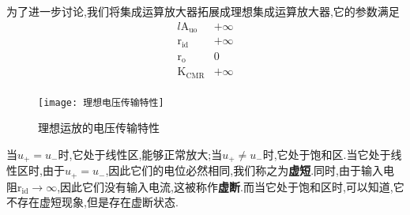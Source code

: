 \Par 为了进一步讨论,我们将集成运算放大器拓展成理想集成运算放大器,它的参数满足
\begin{equation*}
    \begin{matrix}{l}
        \mathrm{A}_{\mathrm{uo}}&		+\infty\\
        \mathrm{r}_{\mathrm{id}}&		+\infty\\
        \mathrm{r}_{\mathrm{o}}&		0\\
        \mathrm{K}_{\mathrm{CMR}}&		+\infty\\
    \end{matrix}
\end{equation*}
\begin{figure}[htbp]
	\centering
	\texttt{[image: 理想电压传输特性]}
	\caption{理想运放的电压传输特性}
	\label{fig:理想运放的电压传输特性}
\end{figure}
\Par 当$u_+=u_-$时,它处于线性区,能够正常放大;当$u_+\ne u_-$时,它处于饱和区.当它处于线性区时,由于$u_+=u_-$,因此它们的电位必然相同,我们称之为\textbf{虚短}.同时,由于输入电阻$\mathrm{r}_{\mathrm{id}}\to \infty$,因此它们没有输入电流,这被称作\textbf{虚断}.而当它处于饱和区时,可以知道,它不存在虚短现象,但是存在虚断状态.